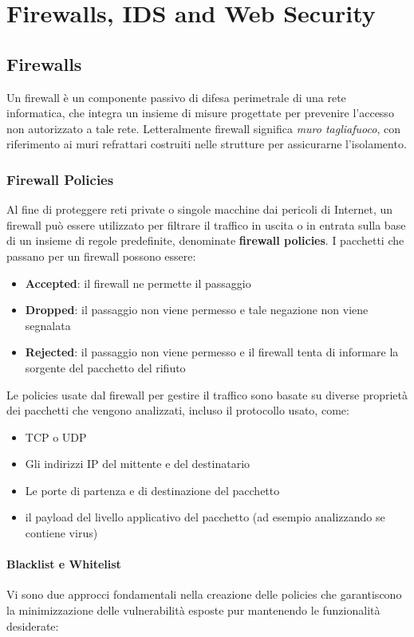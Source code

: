 \chapter{Firewalls, IDS and Web Security}
\section{Firewalls}
Un firewall è un componente passivo di difesa perimetrale di una rete informatica, che integra un insieme di misure progettate per prevenire l'accesso non autorizzato a tale rete. Letteralmente firewall significa \textit{muro tagliafuoco}, con riferimento ai muri refrattari costruiti nelle strutture per assicurarne l'isolamento.

\subsection{Firewall Policies}
Al fine di proteggere reti private o singole macchine dai pericoli di Internet, un firewall può essere utilizzato per filtrare il traffico in uscita o in entrata sulla base di un insieme di regole predefinite, denominate \textbf{firewall policies}.
I pacchetti che passano per un firewall possono essere:
\begin{itemize}
\item \textbf{Accepted}: il firewall ne permette il passaggio
\item \textbf{Dropped}: il passaggio non viene permesso e tale negazione non viene segnalata
\item  \textbf{Rejected}: il passaggio non viene permesso e il firewall tenta di informare la sorgente del pacchetto del rifiuto
\end{itemize}
Le policies usate dal firewall per gestire il traffico sono basate su diverse proprietà dei pacchetti che vengono analizzati, incluso il protocollo usato, come:
\begin{itemize}
\item TCP o UDP
\item Gli indirizzi IP del mittente e del destinatario
\item Le porte di partenza e di destinazione del pacchetto
\item il payload del livello applicativo del pacchetto (ad esempio analizzando se contiene virus)
\end{itemize}
\subsubsection{Blacklist e Whitelist}
Vi sono due approcci fondamentali nella creazione delle policies che garantiscono la minimizzazione delle vulnerabilità esposte pur mantenendo le funzionalità desiderate:

